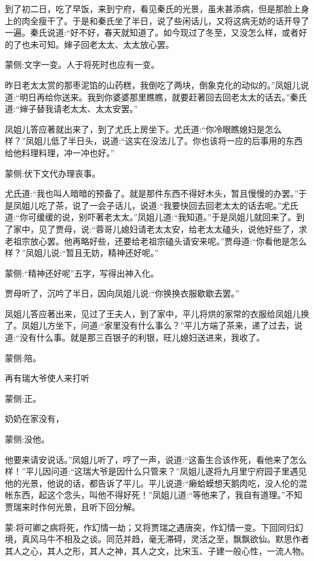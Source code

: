 \begin{parag}
    到了初二日，吃了早饭，来到宁府，看见秦氏的光景，虽未甚添病，但是那脸上身上的肉全瘦干了。于是和秦氏坐了半日，说了些闲话儿，又将这病无妨的话开导了一遍。秦氏说道:“好不好，春天就知道了。如今现过了冬至，又没怎么样，或者好的了也未可知。婶子回老太太、太太放心罢。\begin{note}蒙侧:文字一变。人于将死时也应有一变。\end{note}昨日老太太赏的那枣泥馅的山药糕，我倒吃了两块，倒象克化的动似的。”凤姐儿说道:“明日再给你送来。我到你婆婆那里瞧瞧，就要赶著回去回老太太的话去。”秦氏道:“婶子替我请老太太、太太安罢。”
\end{parag}


\begin{parag}
    凤姐儿答应著就出来了，到了尤氏上房坐下。尤氏道:“你冷眼瞧媳妇是怎么样？”凤姐儿低了半日头，说道:“这实在没法儿了。你也该将一应的后事用的东西给他料理料理，冲一冲也好。”\begin{note}蒙侧:伏下文代办理丧事。\end{note}尤氏道:“我也叫人暗暗的预备了。就是那件东西不得好木头，暂且慢慢的办罢。”于是凤姐儿吃了茶，说了一会子话儿，说道:“我要快回去回老太太的话去呢。”尤氏道:“你可缓缓的说，别吓著老太太。”凤姐儿道:“我知道。”于是凤姐儿就回来了。到了家中，见了贾母，说:“蓉哥儿媳妇请老太太安，给老太太磕头，说他好些了，求老祖宗放心罢。他再略好些，还要给老祖宗磕头请安来呢。”贾母道:“你看他是怎么样？”凤姐儿说:“暂且无妨，精神还好呢。”\begin{note}蒙侧:“精神还好呢”五字，写得出神入化。\end{note}贾母听了，沉吟了半日，因向凤姐儿说:“你换换衣服歇歇去罢。”
\end{parag}


\begin{parag}
    凤姐儿答应著出来，见过了王夫人，到了家中，平儿将烘的家常的衣服给凤姐儿换了。凤姐儿方坐下，问道:“家里没有什么事么？”平儿方端了茶来，递了过去，说道:“没有什么事。就是那三百银子的利银，旺儿媳妇送进来，我收了。\begin{note}蒙侧:陪。\end{note}再有瑞大爷使人来打听\begin{note}蒙侧:正。\end{note}奶奶在家没有，\begin{note}蒙侧:没他。\end{note}他要来请安说话。”凤姐儿听了，哼了一声，说道:“这畜生合该作死，看他来了怎么样！”平儿因问道:“这瑞大爷是因什么只管来？”凤姐儿遂将九月里宁府园子里遇见他的光景，他说的话，都告诉了平儿。平儿说道:“癞蛤蟆想天鹅肉吃，没人伦的混帐东西，起这个念头，叫他不得好死！”凤姐儿道:“等他来了，我自有道理。”不知贾瑞来时作何光景，且听下回分解。
\end{parag}


\begin{parag}
    \begin{note}蒙:将可卿之病将死，作幻情一劫；又将贾瑞之遇唐突，作幻情一变。下回同归幻境，真风马牛不相及之谈。同范并趋，毫无滞碍，灵活之至，飘飘欲仙。默思作者其人之心，其人之形，其人之神，其人之文，比宋玉、子建一般心性，一流人物。\end{note}
\end{parag}
